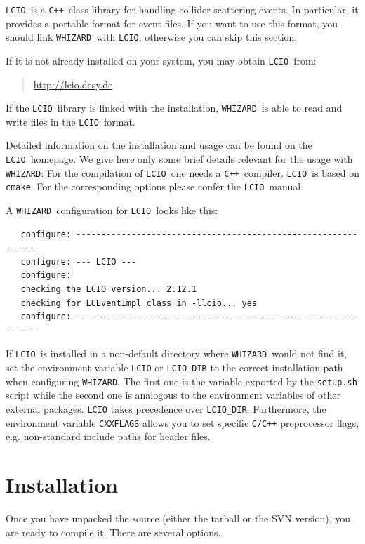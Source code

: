 \documentclass[12pt]{book}
\newcommand{\ttt}[1]{\texttt{#1}}
\newcommand{\whizard}{\ttt{WHIZARD}}
\newcommand{\lcio}{\ttt{LCIO}}
\newcommand{\cpp}{\ttt{C++}}
\begin{document}
\lcio\ is a \cpp\ class library for handling collider scattering
events.  In particular, it provides a portable format for event files.
If you want to use this format, you should link \whizard\ with \lcio,
otherwise you can skip this section.

If it is not already installed on your system, you may obtain
\lcio\ from:
\begin{quote}
  \url{http://lcio.desy.de}
\end{quote}
If the \lcio\ library is linked with the installation, \whizard\ is
able to read and write files in the \lcio\ format.

Detailed information on the installation and usage can be found on the
\lcio\ homepage. We give here only some brief details relevant for
the usage with \whizard: For the compilation of \lcio\ one needs a
\cpp\ compiler. \lcio\ is based on \ttt{cmake}. For the
corresponding options please confer the \lcio\ manual.

A \whizard\ configuration for \lcio\ looks like this:
\begin{footnotesize}
  \begin{verbatim}
   configure: --------------------------------------------------------------
   configure: --- LCIO ---
   configure:
   checking the LCIO version... 2.12.1
   checking for LCEventImpl class in -llcio... yes
   configure: --------------------------------------------------------------
  \end{verbatim}
\end{footnotesize}

If \lcio\ is installed in a non-default directory where \whizard\
would not find it, set the environment variable \ttt{LCIO} or
\ttt{LCIO\_DIR} to the correct installation path when configuring
\whizard.  The first one is the variable exported by the
\ttt{setup.sh}  script while the second one is analogous to the
environment variables of other external packages. \ttt{LCIO} takes
precedence over \ttt{LCIO\_DIR}. Furthermore, the environment variable
\ttt{CXXFLAGS} allows you to set specific \ttt{C/C++} preprocessor
flags, e.g. non-standard include paths for header files.


\section{Installation}
\label{sec:installation}

Once you have unpacked the source (either the tarball or the SVN
version), you are ready to compile it.  There are several options.
\end{document}
